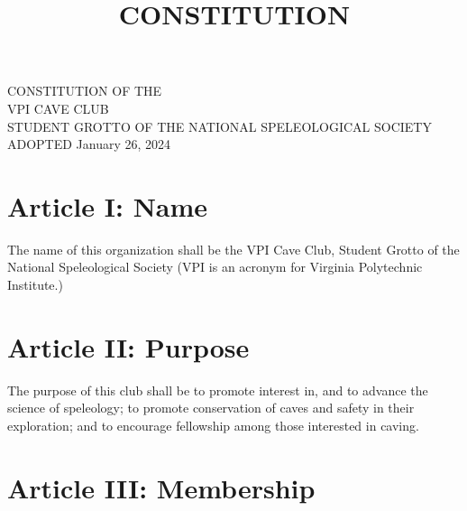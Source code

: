 \documentclass[
]{article}
\title{CONSTITUTION}
\author{}
\date{}
\begin{document}
\maketitle

{
\setcounter{tocdepth}{3}
\tableofcontents
}
\newpage{}

CONSTITUTION OF THE\\
VPI CAVE CLUB\\
STUDENT GROTTO OF THE NATIONAL SPELEOLOGICAL SOCIETY\\
ADOPTED January 26, 2024

\hypertarget{article-i-name}{%
\section{Article I: Name}\label{article-i-name}}

The name of this organization shall be the VPI Cave Club, Student Grotto
of the National Speleological Society (VPI is an acronym for Virginia
Polytechnic Institute.)

\hypertarget{article-ii-purpose}{%
\section{Article II: Purpose}\label{article-ii-purpose}}

The purpose of this club shall be to promote interest in, and to advance
the science of speleology; to promote conservation of caves and safety
in their exploration; and to encourage fellowship among those interested
in caving.

\hypertarget{article-iii-membership}{%
\section{Article III: Membership}\label{article-iii-membership}}
\end{document}
